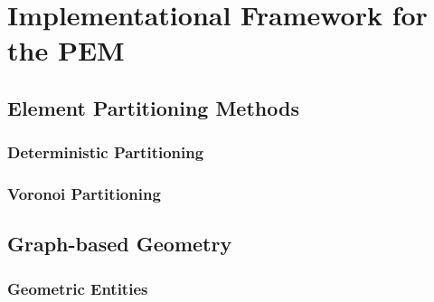 \chapter{Implementational Framework for the PEM}


\section{Element Partitioning Methods}
	
	\subsection{Deterministic Partitioning} %

	\subsection{Voronoi Partitioning} %

\section{Graph-based Geometry}

	\subsection{Geometric Entities}
	

